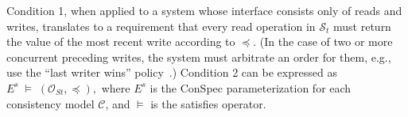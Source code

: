 \documentclass[acmlarge, ,11pt]{acmart}
\begin{document}
Condition 1, when applied to a system whose interface consists only of reads and writes, translates to a requirement that every read operation in $\mathcal{S}_t$ must return the value of the most recent write according to $\preccurlyeq$. (In the case of two or more concurrent preceding writes, the system must arbitrate an order for them, e.g., use the ``last writer wins'' policy~\cite{lww}.)
  Condition 2 can be expressed as $ E^s\; \vDash \; \left( {\mathcal{O}_{St}}, \preccurlyeq \right),$ where %
  $E^s$ is the ConSpec parameterization for each
 consistency model $\mathcal{C}$,
 and  $\vDash$ is the satisfies operator.


\end{document}
